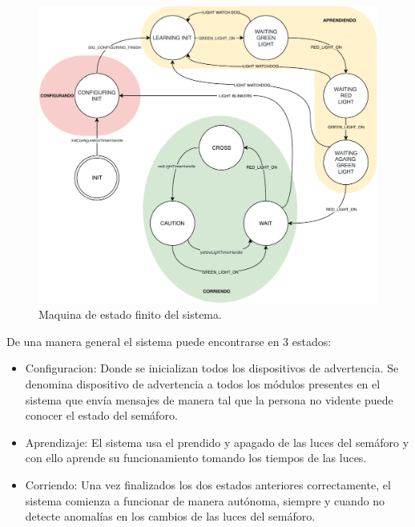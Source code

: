 \begin{figure}[h]
	\centering
	\includegraphics[scale=.7]{./Figures/maquinaEstadoFinitoSoniforo.pdf}
	\caption{Maquina de estado finito del sistema.}
	\label{fig:maquinaEstadoFinitoSoniforo}
\end{figure}

De una manera general el sistema puede encontrarse en 3 estados:

\begin{itemize}
\item Configuracion: Donde se inicializan todos los dispositivos de advertencia. Se denomina dispositivo de advertencia a todos los módulos presentes en el sistema que envía mensajes de manera tal que la persona no vidente puede conocer el estado del semáforo.
\item Aprendizaje: El sistema usa el prendido y apagado de las luces del semáforo y con ello aprende su funcionamiento tomando los tiempos de las luces.
\item Corriendo: Una  vez finalizados los dos estados anteriores correctamente, el sistema comienza a funcionar de manera autónoma, siempre y cuando no detecte anomalías en los cambios de las luces del semáforo.
\end{itemize}

